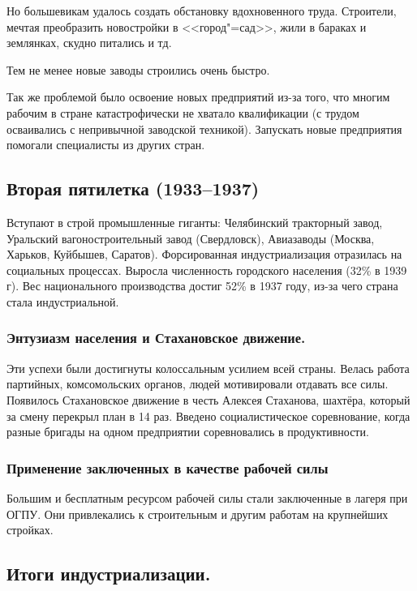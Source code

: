 Но большевикам удалось создать обстановку вдохновенного труда. Строители, мечтая преобразить новостройки в <<город"=сад>>, жили в  бараках и землянках, скудно питались и тд.

Тем не менее новые заводы строились очень быстро.

Так же проблемой было освоение новых предприятий из-за того, что многим рабочим в стране катастрофически не хватало квалификации (с трудом осваивались с непривычной заводской техникой). Запускать новые предприятия помогали специалисты из других стран.

\subsection{Вторая пятилетка (1933--1937)}

Вступают в строй промышленные гиганты: Челябинский тракторный завод, Уральский вагоностроительный завод (Свердловск), Авиазаводы (Москва, Харьков, Куйбышев, Саратов).
Форсированная индустриализация отразилась на социальных процессах. Выросла численность городского населения (32\% в 1939 г). Вес национального производства достиг 52\% в 1937 году, из-за чего страна стала индустриальной. 

\subsubsection{\textbf{Энтузиазм населения и Стахановское движение.}}

Эти успехи были достигнуты колоссальным усилием всей страны. Велась работа партийных, комсомольских органов, людей мотивировали отдавать все силы. Появилось Стахановское движение в честь Алексея Стаханова, шахтёра, который за смену перекрыл план в 14 раз. Введено социалистическое соревнование, когда разные бригады на одном предприятии соревновались в продуктивности.

\subsubsection{\textbf{Применение заключенных в качестве рабочей силы}}

Большим и бесплатным ресурсом рабочей силы стали заключенные в лагеря при ОГПУ. Они привлекались к строительным и другим работам на крупнейших стройках.

\subsection{Итоги индустриализации.}

